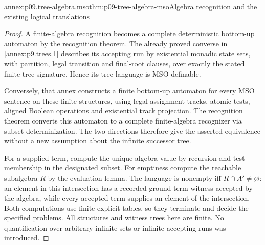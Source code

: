 \begin{annexitem}{annex:p09.tree-algebra.mso}{thm:p09-tree-algebra-mso}{Algebra recognition and the existing logical translations}
\begin{proof}
A finite-algebra recognition becomes a complete deterministic bottom-up
automaton by the recognition theorem. The already proved converse in
\cref{annex:p9.trees.1} describes its accepting run by existential
monadic state sets, with partition, legal transition and final-root
clauses, over exactly the stated finite-tree signature.
Hence its tree language is MSO definable.

Conversely, that annex constructs a finite bottom-up automaton for
every MSO sentence on these finite structures, using legal assignment
tracks, atomic tests, aligned Boolean operations and existential
track projection. The recognition theorem converts this automaton
to a complete finite-algebra recognizer via subset determinization.
The two directions therefore give the asserted equivalence without
a new assumption about the infinite successor tree.

For a supplied term, compute the unique algebra value by recursion
and test membership in the designated subset. For emptiness compute
the reachable subalgebra \(R\) by the evaluation lemma.
The language is nonempty iff \(R\cap A'\ne\varnothing\):
an element in this intersection has a recorded ground-term witness
accepted by the algebra, while every accepted term supplies an element
of the intersection. Both computations use finite explicit tables,
so they terminate and decide the specified problems.
All structures and witness trees here are finite. No quantification
over arbitrary infinite sets or infinite accepting runs was introduced.
\end{proof}
\end{annexitem}
